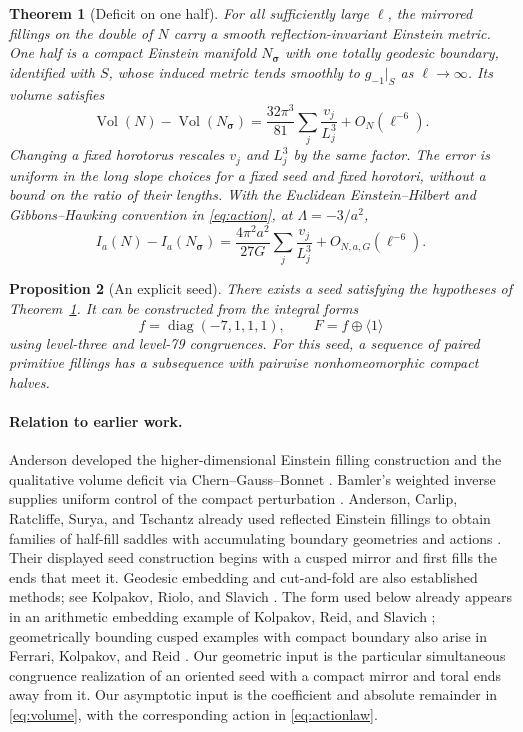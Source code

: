 \documentclass[11pt]{article}
\newtheorem{theorem}{Theorem}
\newtheorem{proposition}[theorem]{Proposition}
\theoremstyle{remark}
\newcommand{\Vol}{\operatorname{Vol}}
\newcommand{\diag}{\operatorname{diag}}
\begin{document}
\begin{theorem}[Deficit on one half]\label{thm:law}
For all sufficiently large \(\ell\), the mirrored fillings on the double of \(N\) carry a smooth reflection-invariant Einstein metric. One half is a compact Einstein manifold \(N_{\boldsymbol\sigma}\) with one totally geodesic boundary, identified with \(S\), whose induced metric tends smoothly to \(g_{-1}|_S\) as \(\ell\to\infty\). Its volume satisfies
\begin{equation}\label{eq:volume}
\Vol(N)-\Vol(N_{\boldsymbol\sigma})
=\frac{32\pi^3}{81}\sum_j\frac{v_j}{L_j^3}
+O_N(\ell^{-6}).
\end{equation}
Changing a fixed horotorus rescales \(v_j\) and \(L_j^3\) by the same factor. The error is uniform in the long slope choices for a fixed seed and fixed horotori, without a bound on the ratio of their lengths. With the Euclidean Einstein--Hilbert and Gibbons--Hawking convention in \eqref{eq:action}, at \(\Lambda=-3/a^2\),
\begin{equation}\label{eq:actionlaw}
I_a(N)-I_a(N_{\boldsymbol\sigma})
=\frac{4\pi^2a^2}{27G}\sum_j\frac{v_j}{L_j^3}
+O_{N,a,G}(\ell^{-6}).
\end{equation}
\end{theorem}

\begin{proposition}[An explicit seed]\label{prop:seed}
There exists a seed satisfying the hypotheses of Theorem~\ref{thm:law}. It can be constructed from the integral forms
\[
 f=\diag(-7,1,1,1),\qquad F=f\oplus\langle1\rangle
\]
using level-three and level-79 congruences. For this seed, a sequence of paired primitive fillings has a subsequence with pairwise nonhomeomorphic compact halves.
\end{proposition}

\paragraph{Relation to earlier work.}
Anderson developed the higher-dimensional Einstein filling construction and the qualitative volume deficit via Chern--Gauss--Bonnet \cite[Theorem~1.1 and \S4]{anderson}. Bamler's weighted inverse supplies uniform control of the compact perturbation \cite[\S\S3--5]{bamler}. Anderson, Carlip, Ratcliffe, Surya, and Tschantz already used reflected Einstein fillings to obtain families of half-fill saddles with accumulating boundary geometries and actions \cite[\S\S4--5]{acr}. Their displayed seed construction begins with a cusped mirror and first fills the ends that meet it. Geodesic embedding and cut-and-fold are also established methods; see Kolpakov, Riolo, and Slavich \cite[Theorem~2.2 and \S3.1]{krs}. The form used below already appears in an arithmetic embedding example of Kolpakov, Reid, and Slavich \cite[\S5]{krl}; geometrically bounding cusped examples with compact boundary also arise in Ferrari, Kolpakov, and Reid \cite[Theorem~B]{fkr}. Our geometric input is the particular simultaneous congruence realization of an oriented seed with a compact mirror and toral ends away from it. Our asymptotic input is the coefficient and absolute remainder in \eqref{eq:volume}, with the corresponding action in \eqref{eq:actionlaw}.
\end{document}
